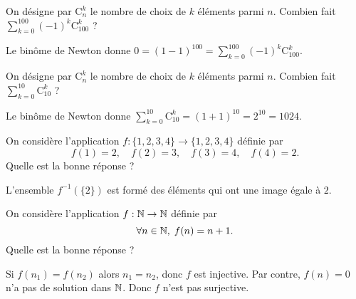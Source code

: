\begin{question}
On désigne par $\mathrm{C}^k_n$ le nombre de choix de $k$ éléments parmi $n$. Combien fait $\displaystyle \sum _{k=0}^{100}(-1)^k\mathrm{C}^k_{100}$ ?
\begin{answers}  
\end{answers}
\begin{explanations}
Le binôme de Newton donne $\displaystyle 0=(1-1)^{100}=\sum _{k=0}^{100}(-1)^k\mathrm{C}^k_{100}$.
\end{explanations}
\end{question}

\begin{question}
On désigne par $\mathrm{C}^k_n$ le nombre de choix de $k$ éléments parmi $n$. Combien fait $\displaystyle \sum _{k=0}^{10}\mathrm{C}^k_{10}$ ?
\begin{answers}  
\end{answers}
\begin{explanations}
Le binôme de Newton donne $\displaystyle \sum _{k=0}^{10}\mathrm{C}^k_{10}=(1+1)^{10}=2^{10}=1024$.
\end{explanations}
\end{question}


\begin{question}
On considère l'application $f:\{1,2,3,4\}\to \{1,2,3,4\}$ définie par
$$f(1)=2,\quad f(2)=3,\quad f(3)=4,\quad f(4)=2.$$
Quelle est la bonne réponse ?
\begin{answers}  
\end{answers}
\begin{explanations}
L'ensemble $f^{-1}(\{2\})$ est formé des éléments qui ont une image égale à $2$.
\end{explanations}
\end{question}


\begin{question}
On considère l'application $f:\mathbb{N}\to \mathbb{N}$ définie par
$$\forall n\in \mathbb{N},\; f(n)=n+1.$$
Quelle est la bonne réponse ?
\begin{answers}  
\end{answers}
\begin{explanations}
Si $f(n_1)=f(n_2)$ alors $n_1=n_2$, donc $f$ est injective. Par contre, $f(n)=0$ n'a pas de solution dans $\mathbb{N}$. Donc $f$ n'est pas surjective.
\end{explanations}
\end{question}


